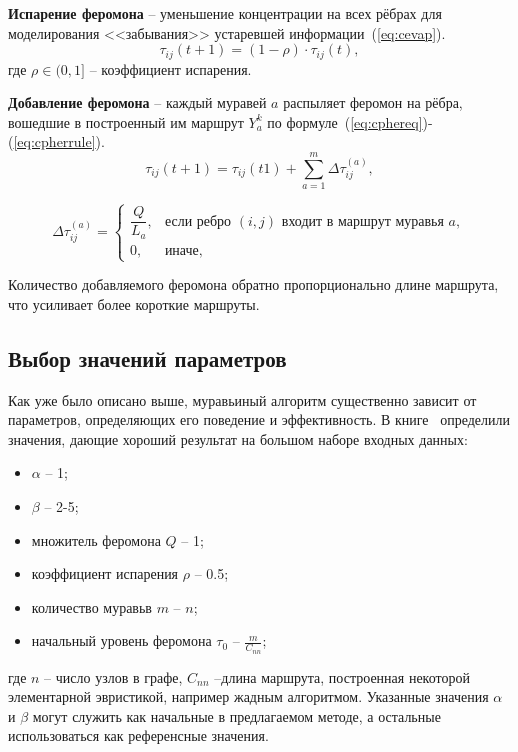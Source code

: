 \textbf{Испарение феромона} -- уменьшение концентрации на всех рёбрах для моделирования <<забывания>> устаревшей информации~(\ref{eq:cevap}).
\begin{equation}
	\tau_{ij}(t+1) = (1 - \rho) \cdot \tau_{ij}(t),
	\label{eq:cevap}
\end{equation}
где $\rho \in (0, 1]$ -- коэффициент испарения.

\textbf{Добавление феромона} -- каждый муравей \( a \) распыляет феромон на рёбра, вошедшие в построенный им маршрут \( Y_a^k \) по формуле~(\ref{eq:cphereq})-(\ref{eq:cpherrule}). 
\begin{equation}
	\tau_{ij}(t+1) = \tau_{ij}(t1) + \sum_{a=1}^{m} \Delta\tau_{ij}^{(a)},
	\label{eq:cphereq}
\end{equation}

\begin{equation}
\Delta\tau_{ij}^{(a)} = 
\begin{cases}
	\dfrac{Q}{L_a}, & \text{если ребро } (i,j) \text{ входит в маршрут муравья } a, \\
	0, & \text{иначе},
	\label{eq:cpherrule}
\end{cases}
\end{equation}

Количество добавляемого феромона обратно пропорционально длине маршрута, что усиливает более короткие маршруты.

\subsection{Выбор значений параметров}

Как уже было описано выше, муравьиный алгоритм существенно зависит от параметров, определяющих его поведение и эффективность. В книге~\cite{dorigo-ant-book} определили значения, дающие хороший результат на большом наборе входных данных:

\begin{itemize}
	\item $\alpha$ -- 1;
	\item $\beta$ -- 2-5;
	\item множитель феромона $Q$ -- 1;
	\item коэффициент испарения $\rho$ -- 0.5;
	\item количество муравьв $m$ -- $n$;
	\item начальный уровень феромона $\tau_0$ -- $\frac{m}{C_{nn}}$;
\end{itemize}

где $n$ -- число узлов в графе, $C_{nn}$ --длина маршрута, построенная некоторой элементарной эвристикой, например жадным алгоритмом. Указанные значения $\alpha$ и $\beta$ могут служить как начальные в предлагаемом методе, а остальные использоваться как референсные значения.

